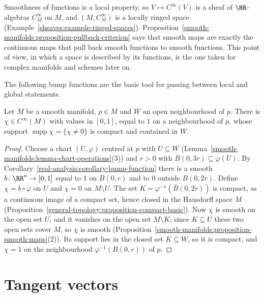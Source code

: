 \begin{remark}\label{smooth-manifolds:remark-ringed-space}
Smoothness of functions is a local property, so $V \mapsto C^\infty(V)$ is a sheaf of $\RR$-algebras $C^\infty_M$ on $M$, and $(M, C^\infty_M)$ is a locally
ringed space (Example~\ref{sheaves:example-ringed-spaces}). Proposition~\ref{smooth-manifolds:proposition-pullback-criterion} says that smooth maps are exactly the
continuous maps that pull back smooth functions to smooth functions. This point of view, in which a space is described by its functions, is the one taken for
complex manifolds and schemes later on.
\end{remark}

The following bump functions are the basic tool for passing between local and global statements.

\begin{lemma}\label{smooth-manifolds:lemma-bump-manifold}
Let $M$ be a smooth manifold, $p \in M$ and $W$ an open neighbourhood of $p$. There is $\chi \in C^\infty(M)$ with values in $[0, 1]$, equal to $1$ on a
neighbourhood of $p$, whose support $\operatorname{supp}\chi = \overline{\{\chi \neq 0\}}$ is compact and contained in $W$.
\end{lemma}

\begin{proof}
Choose a chart $(U, \varphi)$ centred at $p$ with $U \subseteq W$ (Lemma~\ref{smooth-manifolds:lemma-chart-operations}(3)) and $r > 0$ with
$\overline{B}(0, 3r) \subseteq \varphi(U)$. By Corollary~\ref{real-analysis:corollary-bump-function} there is a smooth $b \colon \RR^n \to [0, 1]$ equal to $1$ on
$\overline{B}(0, r)$ and to $0$ outside $B(0, 2r)$. Define $\chi = b \circ \varphi$ on $U$ and $\chi = 0$ on $M \setminus U$. The set
$K = \varphi^{-1}(\overline{B}(0, 2r))$ is compact, as a continuous image of a compact set, hence closed in the Hausdorff space $M$
(Proposition~\ref{general-topology:proposition-compact-basic}). Now $\chi$ is smooth on the open set $U$, and it vanishes on the open set $M \setminus K$; since
$K \subseteq U$ these two open sets cover $M$, so $\chi$ is smooth (Proposition~\ref{smooth-manifolds:proposition-smooth-maps}(2)). Its support lies in the
closed set $K \subseteq W$, so it is compact, and $\chi = 1$ on the neighbourhood $\varphi^{-1}(B(0, r))$ of $p$.
\end{proof}

\section{Tangent vectors}\label{smooth-manifolds:section-tangent}


